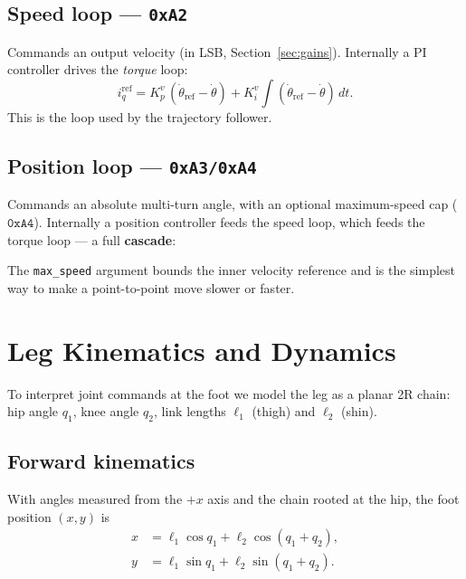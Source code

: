 \documentclass[11pt,a4paper]{article}
\newcommand{\code}[1]{\texttt{#1}}
\begin{document}
\subsection{Speed loop --- \texttt{0xA2}}
Commands an output velocity (in LSB, Section~\ref{sec:gains}). Internally a
PI controller drives the \emph{torque} loop:
\begin{equation}
  i_q^{\text{ref}} = K_{p}^{v}\,(\dot\theta_{\text{ref}}-\dot\theta)
                   + K_{i}^{v}\!\int (\dot\theta_{\text{ref}}-\dot\theta)\,dt .
\end{equation}
This is the loop used by the trajectory follower.

\subsection{Position loop --- \texttt{0xA3/0xA4}}
Commands an absolute multi-turn angle, with an optional maximum-speed cap
($\texttt{0xA4}$). Internally a position controller feeds the speed loop, which
feeds the torque loop --- a full \textbf{cascade}:
\begin{center}
\end{center}
The \code{max\_speed} argument bounds the inner velocity reference and is the
simplest way to make a point-to-point move slower or faster.

\section{Leg Kinematics and Dynamics}

To interpret joint commands at the foot we model the leg as a planar 2R chain:
hip angle $q_1$, knee angle $q_2$, link lengths $\ell_1$ (thigh) and $\ell_2$
(shin).

\subsection{Forward kinematics}
With angles measured from the $+x$ axis and the chain rooted at the hip, the foot
position $(x,y)$ is
\begin{align}
  x &= \ell_1\cos q_1 + \ell_2\cos(q_1+q_2),\\
  y &= \ell_1\sin q_1 + \ell_2\sin(q_1+q_2).
\end{align}
\end{document}
